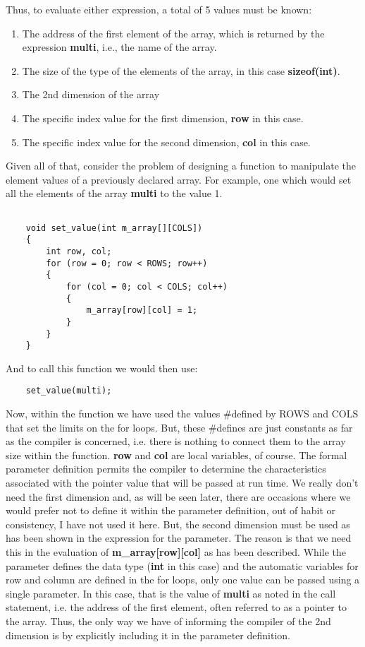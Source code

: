 Thus, to evaluate either expression, a total of 5 values must be known:

\begin{enumerate}
\tightlist
\item
  The address of the first element of the array, which is returned by
  the expression \textbf{multi}, i.e., the name of the array.
\item
  The size of the type of the elements of the array, in this case
  \textbf{sizeof(int)}.
\item
  The 2nd dimension of the array
\item
  The specific index value for the first dimension, \textbf{row} in this
  case.
\item
  The specific index value for the second dimension, \textbf{col} in
  this case.
\end{enumerate}

Given all of that, consider the problem of designing a function to
manipulate the element values of a previously declared array. For
example, one which would set all the elements of the array
\textbf{multi} to the value 1.

\begin{verbatim}

    void set_value(int m_array[][COLS])
    {
        int row, col;
        for (row = 0; row < ROWS; row++)
        {
            for (col = 0; col < COLS; col++)
            {
                m_array[row][col] = 1;
            }
        }
    }
\end{verbatim}

And to call this function we would then use:

\begin{verbatim}
    set_value(multi);
\end{verbatim}

Now, within the function we have used the values \#defined by ROWS and
COLS that set the limits on the for loops. But, these \#defines are just
constants as far as the compiler is concerned, i.e. there is nothing to
connect them to the array size within the function. \textbf{row} and
\textbf{col} are local variables, of course. The formal parameter
definition permits the compiler to determine the characteristics
associated with the pointer value that will be passed at run time. We
really don't need the first dimension and, as will be seen later, there
are occasions where we would prefer not to define it within the
parameter definition, out of habit or consistency, I have not used it
here. But, the second dimension must be used as has been shown in the
expression for the parameter. The reason is that we need this in the
evaluation of \textbf{m\_array{[}row{]}{[}col{]}} as has been described.
While the parameter defines the data type (\textbf{int} in this case)
and the automatic variables for row and column are defined in the for
loops, only one value can be passed using a single parameter. In this
case, that is the value of \textbf{multi} as noted in the call
statement, i.e. the address of the first element, often referred to as a
pointer to the array. Thus, the only way we have of informing the
compiler of the 2nd dimension is by explicitly including it in the
parameter definition.

